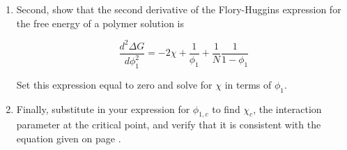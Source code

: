 \begin{activity}
\begin{exercises}
\begin{enumerate}
		
			\item Second, show that the second derivative of the Flory-Huggins expression for the free energy of a polymer solution is
	
				\begin{equation*}
					\frac{d^2\Delta G}{d\phi_1^2} = -2\chi + \frac{1}{\phi_1} + \frac{1}{N}\frac{1}{1-\phi_1}
				\end{equation*}
		
				Set this expression equal to zero and solve for $\chi$ in terms of $\phi_1$.
			
				\begin{solution}\end{solution}
				
				
			\item Finally, substitute in your expression for $\phi_{1,c}$ to find $\chi_c$, the interaction parameter at the critical point, and verify that it is consistent with the equation given on page \pageref{\labelbase:infobox:critpt}.
			
				\begin{solution}\end{solution}
				

\end{enumerate}
\end{exercises}
\end{activity}
